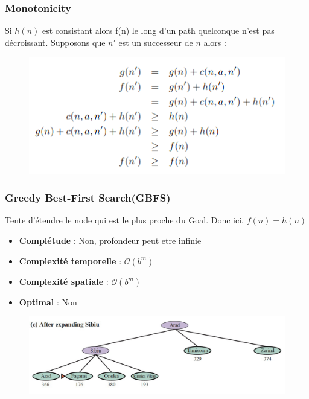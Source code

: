 		\subsubsection{Monotonicity} 
			Si $h(n)$ est consistant alors f(n) le long d'un path quelconque n'est pas décroissant. Supposons que $n'$ est un successeur de $n$ alors :
			
			\begin{figure}[htp]
				\centering
				\includegraphics[scale=1]{img/Monotonicité.png}
			\end{figure}
		\subsubsection{Greedy Best-First Search(GBFS)}
			Tente d'étendre le node qui est le plus proche du Goal. Donc ici, $f(n) = h(n)$
						
			\begin{itemize}
				\item \textbf{Complétude} : Non, profondeur peut etre infinie
				\item \textbf{Complexité temporelle} : $\mathcal{O}(b^m)$
				\item \textbf{Complexité spatiale} : $\mathcal{O}(b^m)$
				\item \textbf{Optimal} : Non
			\end{itemize}
			
			\begin{figure}[htp]
				\centering
				\includegraphics[width=\textwidth]{img/GBFS.png}
			\end{figure}
			
